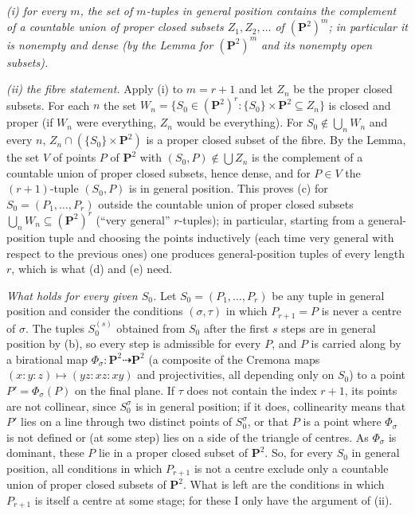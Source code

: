 \documentclass[11pt]{article}
\begin{document}
\emph{(i) for every $m$, the set of $m$-tuples in general position contains the complement of a countable union of proper closed subsets $Z_1,Z_2,\dots$ of $(\mathbf P^2)^m$; in particular it is nonempty and dense (by the Lemma for $(\mathbf P^2)^m$ and its nonempty open subsets).}

\emph{(ii) the fibre statement.} Apply (i) to $m=r+1$ and let $Z_n$ be the proper closed subsets. For each $n$ the set $W_n=\{S_0\in(\mathbf P^2)^r:\{S_0\}\times\mathbf P^2\subseteq Z_n\}$ is closed and proper (if $W_n$ were everything, $Z_n$ would be everything). For $S_0\notin\bigcup_nW_n$ and every $n$, $Z_n\cap(\{S_0\}\times\mathbf P^2)$ is a proper closed subset of the fibre. By the Lemma, the set $V$ of points $P$ of $\mathbf P^2$ with $(S_0,P)\notin\bigcup Z_n$ is the complement of a countable union of proper closed subsets, hence dense, and for $P\in V$ the $(r+1)$-tuple $(S_0,P)$ is in general position. This proves (c) for $S_0=(P_1,\dots,P_r)$ outside the countable union of proper closed subsets $\bigcup_nW_n\subseteq(\mathbf P^2)^r$ (``very general'' $r$-tuples); in particular, starting from a general-position tuple and choosing the points inductively (each time very general with respect to the previous ones) one produces general-position tuples of every length $r$, which is what (d) and (e) need.

\emph{What holds for every given $S_0$.} Let $S_0=(P_1,\dots,P_r)$ be any tuple in general position and consider the conditions $(\sigma,\tau)$ in which $P_{r+1}=P$ is never a centre of $\sigma$. The tuples $S_0^{(s)}$ obtained from $S_0$ after the first $s$ steps are in general position by (b), so every step is admissible for every $P$, and $P$ is carried along by a birational map $\Phi_\sigma:\mathbf P^2\dashrightarrow\mathbf P^2$ (a composite of the Cremona maps $(x:y:z)\mapsto(yz:xz:xy)$ and projectivities, all depending only on $S_0$) to a point $P'=\Phi_\sigma(P)$ on the final plane. If $\tau$ does not contain the index $r+1$, its points are not collinear, since $S_0^{\sigma}$ is in general position; if it does, collinearity means that $P'$ lies on a line through two distinct points of $S_0^{\sigma}$, or that $P$ is a point where $\Phi_\sigma$ is not defined or (at some step) lies on a side of the triangle of centres. As $\Phi_\sigma$ is dominant, these $P$ lie in a proper closed subset of $\mathbf P^2$. So, for every $S_0$ in general position, all conditions in which $P_{r+1}$ is not a centre exclude only a countable union of proper closed subsets of $\mathbf P^2$. What is left are the conditions in which $P_{r+1}$ is itself a centre at some stage; for these I only have the argument of (ii).
\end{document}
